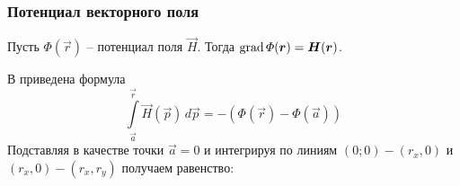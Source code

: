 \begin{frame}\frametitle{Потенциал векторного поля}
	Пусть \(\Phi(\vec r)\) -- потенциал поля \(\vec H\).
	Тогда \(\grad \Phi(\vec r) = \vec H(\vec r)\).

	В \cite{korn} приведена формула
	\begin{equation}
		\int\limits_{\vec a}^{\vec r} \vec H (\vec p) \, d \vec p = - (\Phi(\vec r) - \Phi(\vec a))
		\label{eq:pontential_equation}
	\end{equation}
	Подставляя в качестве точки \(\vec a = 0\) и интегрируя по
	линиям \((0;0) - (r_x, 0)\) и \((r_x, 0) - (r_x, r_y)\)
	получаем равенство:

\end{frame}

